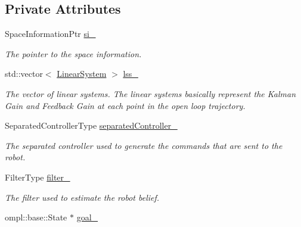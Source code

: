 \subsection*{\-Private \-Attributes}
\begin{DoxyCompactItemize}
\item 
\hypertarget{class_controller_a34912a3b87662649231e2d096882c454}{\-Space\-Information\-Ptr \hyperlink{class_controller_a34912a3b87662649231e2d096882c454}{si\-\_\-}}\label{class_controller_a34912a3b87662649231e2d096882c454}

\begin{DoxyCompactList}\small\item\em \-The pointer to the space information. \end{DoxyCompactList}\item 
\hypertarget{class_controller_acb68b603afc759b4e62b8c6db8125671}{std\-::vector$<$ \hyperlink{class_linear_system}{\-Linear\-System} $>$ \hyperlink{class_controller_acb68b603afc759b4e62b8c6db8125671}{lss\-\_\-}}\label{class_controller_acb68b603afc759b4e62b8c6db8125671}

\begin{DoxyCompactList}\small\item\em \-The vector of linear systems. \-The linear systems basically represent the \-Kalman \-Gain and \-Feedback \-Gain at each point in the open loop trajectory. \end{DoxyCompactList}\item 
\hypertarget{class_controller_a040da727bdc40ab69f0c3e4033bc9df9}{\-Separated\-Controller\-Type \hyperlink{class_controller_a040da727bdc40ab69f0c3e4033bc9df9}{separated\-Controller\-\_\-}}\label{class_controller_a040da727bdc40ab69f0c3e4033bc9df9}

\begin{DoxyCompactList}\small\item\em \-The separated controller used to generate the commands that are sent to the robot. \end{DoxyCompactList}\item 
\hypertarget{class_controller_a9ff37d34a8a9a20f606c501d2ab5cb2e}{\-Filter\-Type \hyperlink{class_controller_a9ff37d34a8a9a20f606c501d2ab5cb2e}{filter\-\_\-}}\label{class_controller_a9ff37d34a8a9a20f606c501d2ab5cb2e}

\begin{DoxyCompactList}\small\item\em \-The filter used to estimate the robot belief. \end{DoxyCompactList}\item 
\hypertarget{class_controller_a4e5e3c0828c9e0d216e7d53f3625d9b4}{ompl\-::base\-::\-State $\ast$ \hyperlink{class_controller_a4e5e3c0828c9e0d216e7d53f3625d9b4}{goal\-\_\-}}\label{class_controller_a4e5e3c0828c9e0d216e7d53f3625d9b4}


\end{DoxyCompactItemize}
